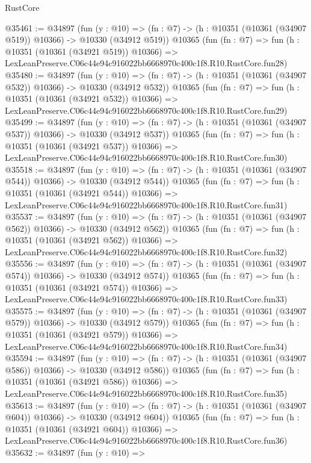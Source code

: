 \begin{lexlean}{RustCore}
\begin{coremodule}
@35461 := @34897
    (fun (y : @10) =>
    (fn : @7) -> (h : @10351 (@10361 (@34907 @519)) @10366) -> @10330 (@34912 @519))
    @10365
    (fun (fn : @7) =>
    fun (h : @10351 (@10361 (@34921 @519)) @10366) =>
    LexLeanPreserve.C06c44e94c916022bb6668970c400c1f8.R10.RustCore.fun28)
@35480 := @34897
    (fun (y : @10) =>
    (fn : @7) -> (h : @10351 (@10361 (@34907 @532)) @10366) -> @10330 (@34912 @532))
    @10365
    (fun (fn : @7) =>
    fun (h : @10351 (@10361 (@34921 @532)) @10366) =>
    LexLeanPreserve.C06c44e94c916022bb6668970c400c1f8.R10.RustCore.fun29)
@35499 := @34897
    (fun (y : @10) =>
    (fn : @7) -> (h : @10351 (@10361 (@34907 @537)) @10366) -> @10330 (@34912 @537))
    @10365
    (fun (fn : @7) =>
    fun (h : @10351 (@10361 (@34921 @537)) @10366) =>
    LexLeanPreserve.C06c44e94c916022bb6668970c400c1f8.R10.RustCore.fun30)
@35518 := @34897
    (fun (y : @10) =>
    (fn : @7) -> (h : @10351 (@10361 (@34907 @544)) @10366) -> @10330 (@34912 @544))
    @10365
    (fun (fn : @7) =>
    fun (h : @10351 (@10361 (@34921 @544)) @10366) =>
    LexLeanPreserve.C06c44e94c916022bb6668970c400c1f8.R10.RustCore.fun31)
@35537 := @34897
    (fun (y : @10) =>
    (fn : @7) -> (h : @10351 (@10361 (@34907 @562)) @10366) -> @10330 (@34912 @562))
    @10365
    (fun (fn : @7) =>
    fun (h : @10351 (@10361 (@34921 @562)) @10366) =>
    LexLeanPreserve.C06c44e94c916022bb6668970c400c1f8.R10.RustCore.fun32)
@35556 := @34897
    (fun (y : @10) =>
    (fn : @7) -> (h : @10351 (@10361 (@34907 @574)) @10366) -> @10330 (@34912 @574))
    @10365
    (fun (fn : @7) =>
    fun (h : @10351 (@10361 (@34921 @574)) @10366) =>
    LexLeanPreserve.C06c44e94c916022bb6668970c400c1f8.R10.RustCore.fun33)
@35575 := @34897
    (fun (y : @10) =>
    (fn : @7) -> (h : @10351 (@10361 (@34907 @579)) @10366) -> @10330 (@34912 @579))
    @10365
    (fun (fn : @7) =>
    fun (h : @10351 (@10361 (@34921 @579)) @10366) =>
    LexLeanPreserve.C06c44e94c916022bb6668970c400c1f8.R10.RustCore.fun34)
@35594 := @34897
    (fun (y : @10) =>
    (fn : @7) -> (h : @10351 (@10361 (@34907 @586)) @10366) -> @10330 (@34912 @586))
    @10365
    (fun (fn : @7) =>
    fun (h : @10351 (@10361 (@34921 @586)) @10366) =>
    LexLeanPreserve.C06c44e94c916022bb6668970c400c1f8.R10.RustCore.fun35)
@35613 := @34897
    (fun (y : @10) =>
    (fn : @7) -> (h : @10351 (@10361 (@34907 @604)) @10366) -> @10330 (@34912 @604))
    @10365
    (fun (fn : @7) =>
    fun (h : @10351 (@10361 (@34921 @604)) @10366) =>
    LexLeanPreserve.C06c44e94c916022bb6668970c400c1f8.R10.RustCore.fun36)
@35632 := @34897
    (fun (y : @10) =>

\end{coremodule}
\end{lexlean}
